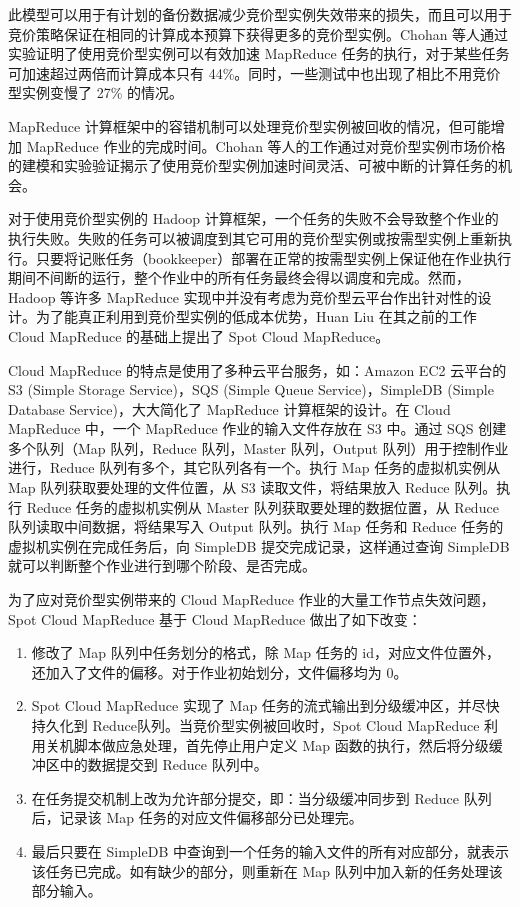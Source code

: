 此模型可以用于有计划的备份数据减少竞价型实例失效带来的损失，而且可以用于竞价策略保证在相同的计算成本预算下获得更多的竞价型实例。Chohan 等人通过实验证明了使用竞价型实例可以有效加速 MapReduce 任务的执行，对于某些任务可加速超过两倍而计算成本只有 44\%。同时，一些测试中也出现了相比不用竞价型实例变慢了 27\% 的情况。

MapReduce 计算框架中的容错机制可以处理竞价型实例被回收的情况，但可能增加 MapReduce 作业的完成时间。Chohan 等人的工作通过对竞价型实例市场价格的建模和实验验证揭示了使用竞价型实例加速时间灵活、可被中断的计算任务的机会。

对于使用竞价型实例的 Hadoop \cite{Hadoop} 计算框架，一个任务的失败不会导致整个作业的执行失败。失败的任务可以被调度到其它可用的竞价型实例或按需型实例上重新执行。只要将记账任务（bookkeeper）部署在正常的按需型实例上保证他在作业执行期间不间断的运行，整个作业中的所有任务最终会得以调度和完成。然而，Hadoop 等许多 MapReduce 实现中并没有考虑为竞价型云平台作出针对性的设计。为了能真正利用到竞价型实例的低成本优势，Huan Liu \cite{Liu:2011:CMC:2170444.2170450} 在其之前的工作 Cloud MapReduce \cite{Liu:2011:CMM:2007336.2007355} 的基础上提出了 Spot Cloud MapReduce。

Cloud MapReduce 的特点是使用了多种云平台服务，如：Amazon EC2 云平台的 S3 (Simple Storage Service)，SQS (Simple Queue Service)，SimpleDB (Simple Database Service)，大大简化了 MapReduce 计算框架的设计。在 Cloud MapReduce 中，一个 MapReduce 作业的输入文件存放在 S3 中。通过 SQS 创建多个队列（Map 队列，Reduce 队列，Master 队列，Output 队列）用于控制作业进行，Reduce 队列有多个，其它队列各有一个。执行 Map 任务的虚拟机实例从 Map 队列获取要处理的文件位置，从 S3 读取文件，将结果放入 Reduce 队列。执行 Reduce 任务的虚拟机实例从 Master 队列获取要处理的数据位置，从 Reduce 队列读取中间数据，将结果写入 Output 队列。执行 Map 任务和 Reduce 任务的虚拟机实例在完成任务后，向 SimpleDB 提交完成记录，这样通过查询 SimpleDB 就可以判断整个作业进行到哪个阶段、是否完成。

为了应对竞价型实例带来的 Cloud MapReduce 作业的大量工作节点失效问题，Spot Cloud MapReduce 基于 Cloud MapReduce 做出了如下改变：
\begin{enumerate}
\item 修改了 Map 队列中任务划分的格式，除 Map 任务的 id，对应文件位置外，还加入了文件的偏移。对于作业初始划分，文件偏移均为 0。
\item Spot Cloud MapReduce 实现了 Map 任务的流式输出到分级缓冲区，并尽快持久化到 Reduce队列。当竞价型实例被回收时，Spot Cloud MapReduce 利用关机脚本做应急处理，首先停止用户定义 Map 函数的执行，然后将分级缓冲区中的数据提交到 Reduce 队列中。
\item 在任务提交机制上改为允许部分提交，即：当分级缓冲同步到 Reduce 队列后，记录该 Map 任务的对应文件偏移部分已处理完。
\item 最后只要在 SimpleDB 中查询到一个任务的输入文件的所有对应部分，就表示该任务已完成。如有缺少的部分，则重新在 Map 队列中加入新的任务处理该部分输入。
\end{enumerate}

